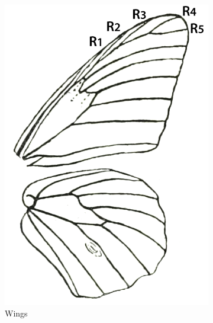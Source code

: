 \documentclass[letterpaper, 11pt]{article}
\begin{document}
\begin{figure}[ht!]
    \centering
    \begin{subfigure}[ht!]{0.28\textwidth}
        \includegraphics[width=\textwidth]{NymphalidWings}
        \caption{Wings \citep[][Fig. 78]{bhl162310}}
        \label{fig:nymphalid1}
    \end{subfigure}
    \hfill %
    \begin{subfigure}[ht!]{0.5\textwidth}

\end{subfigure}
\end{figure}
\end{document}
